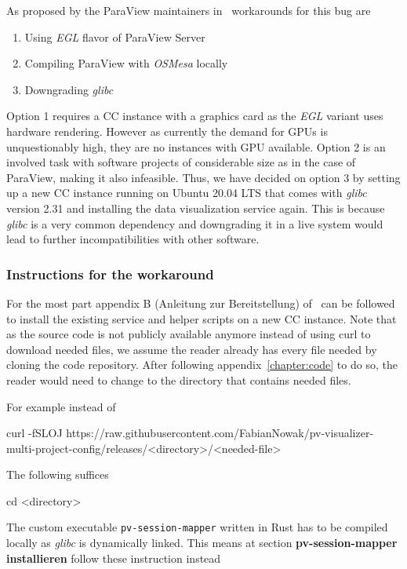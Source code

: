 As proposed by the ParaView maintainers in~\cite{paraviewUsingUbuntu}
workarounds for this bug are

\begin{enumerate}
    \item Using \textit{EGL} flavor of ParaView Server
    \item Compiling ParaView with \textit{OSMesa} locally
    \item Downgrading \textit{glibc}
\end{enumerate}

Option 1 requires a CC instance with a graphics card as the \textit{EGL} variant
uses hardware rendering. However as currently the demand for GPUs is
unquestionably high, they are no instances with GPU available. Option 2 is an
involved task with software projects of considerable size as in the case of
ParaView, making it also infeasible. Thus, we have decided on option 3 by
setting up a new CC instance running on Ubuntu 20.04 LTS that comes with
\textit{glibc} version 2.31 and installing the data visualization service again.
This is because \textit{glibc} is a very common dependency and downgrading it in
a live system would lead to further incompatibilities with other software.

\subsubsection*{Instructions for the workaround}

For the most part appendix B (Anleitung zur Bereitstellung)
of~\cite{nowak2024pvw} can be followed to install the existing service and
helper scripts on a new CC instance. Note that as the source code is not
publicly available anymore instead of using curl to download needed files, we
assume the reader already has every file needed by cloning the code repository.
After following appendix~\ref{chapter:code} to do so, the reader would need to
change to the directory that contains needed files. 

For example instead of
\begin{terminal}
    curl -fSLOJ https://raw.githubusercontent.com/FabianNowak/pv-visualizer-multi-project-config/releases/<directory>/<needed-file>
\end{terminal}

The following suffices
\begin{terminal}
    cd <directory>
\end{terminal}

The custom executable \lstinline{pv-session-mapper} written in Rust has to be
compiled locally as \textit{glibc} is dynamically linked. This means at section
\textbf{pv-session-mapper installieren} follow these instruction instead

